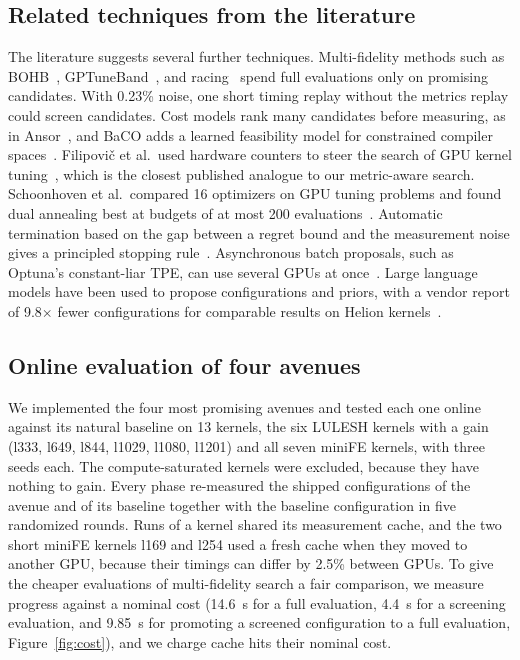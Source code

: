 \documentclass[10pt]{article}
\newcommand{\x}{\ensuremath{\times}}
\begin{document}
\subsection{Related techniques from the literature}
The literature suggests several further techniques. Multi-fidelity methods
such as BOHB~\cite{falkner2018bohb}, GPTuneBand~\cite{zhu2022gptuneband}, and
racing~\cite{lopezibanez2016irace} spend full evaluations only on promising
candidates. With 0.23\% noise, one short timing replay without the metrics
replay could screen candidates. Cost models rank many candidates before
measuring, as in Ansor~\cite{zheng2020ansor}, and BaCO adds a learned
feasibility model for constrained compiler spaces~\cite{hellsten2023baco}.
Filipovi\v{c} et al.\ used hardware counters to steer the search of GPU
kernel tuning~\cite{filipovic2022counters}, which is the closest published
analogue to our metric-aware search. Schoonhoven et al.\ compared 16
optimizers on GPU tuning problems and found dual annealing best at budgets of
at most 200 evaluations~\cite{schoonhoven2023benchmark}. Automatic
termination based on the gap between a regret bound and the measurement noise
gives a principled stopping rule~\cite{makarova2022termination}. Asynchronous
batch proposals, such as Optuna's constant-liar TPE, can use several GPUs at
once~\cite{ginsbourger2010kriging}. Large language models have been used to
propose configurations and priors, with a vendor report of 9.8\x{} fewer
configurations for comparable results on Helion kernels~\cite{helion2026llm}.


\subsection{Online evaluation of four avenues}
\label{sec:avenues}
We implemented the four most promising avenues and tested each one online
against its natural baseline on 13 kernels, the six LULESH kernels with a
gain (l333, l649, l844, l1029, l1080, l1201) and all seven miniFE kernels,
with three seeds each. The compute-saturated kernels were excluded, because
they have nothing to gain. Every phase re-measured the shipped configurations
of the avenue and of its baseline together with the baseline configuration in
five randomized rounds. Runs of a kernel shared its measurement cache, and the
two short miniFE kernels l169 and l254 used a fresh cache when they moved to
another GPU, because their timings can differ by 2.5\% between GPUs. To give
the cheaper evaluations of multi-fidelity search a fair comparison, we measure
progress against a nominal cost (14.6~s for a full evaluation, 4.4~s for a
screening evaluation, and 9.85~s for promoting a screened configuration to a
full evaluation, Figure~\ref{fig:cost}), and we charge cache hits their
nominal cost.
\end{document}
